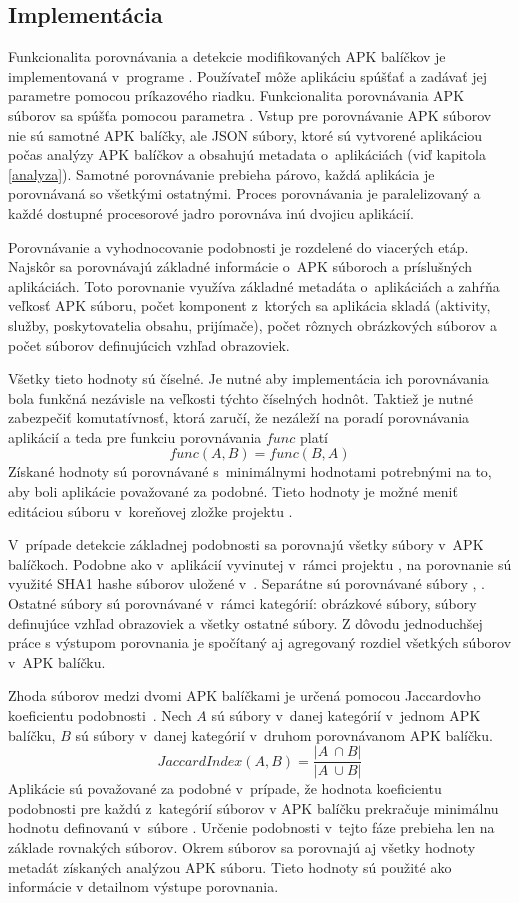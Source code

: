 \subsection{Implementácia}

Funkcionalita porovnávania a detekcie modifikovaných APK balíčkov je implementovaná v~programe . Používateľ môže aplikáciu spúšťať a zadávať jej parametre pomocou príkazového riadku. Funkcionalita porovnávania APK súborov sa spúšťa pomocou parametra . Vstup pre porovnávanie APK súborov nie sú samotné APK balíčky, ale JSON súbory, ktoré sú vytvorené aplikáciou  počas analýzy APK balíčkov a obsahujú metadata o~aplikáciách (viď kapitola \ref{analyza}). Samotné porovnávanie prebieha párovo, každá aplikácia je porovnávaná so všetkými ostatnými. Proces porovnávania je paralelizovaný a každé dostupné procesorové jadro porovnáva inú dvojicu aplikácií. 

Porovnávanie a vyhodnocovanie podobnosti je rozdelené do viacerých etáp. Najskôr sa porovnávajú základné informácie o~APK súboroch a príslušných aplikáciách. Toto porovnanie využíva základné metadáta o~aplikáciách a zahŕňa veľkosť APK súboru, počet komponent z~ktorých sa aplikácia skladá (aktivity, služby, poskytovatelia obsahu, prijímače), počet rôznych obrázkových súborov a počet súborov definujúcich vzhľad obrazoviek.

Všetky tieto hodnoty sú číselné. Je nutné aby implementácia ich porovnávania bola funkčná nezávisle na veľkosti týchto číselných hodnôt. Taktiež je nutné zabezpečiť komutatívnosť, ktorá zaručí, že nezáleží na poradí porovnávania aplikácií a teda pre funkciu porovnávania $func$ platí \[func(A,B) = func(B,A)\] Získané hodnoty sú porovnávané s~minimálnymi hodnotami potrebnými na to, aby boli aplikácie považované za podobné. Tieto hodnoty je možné meniť editáciou súboru  v~koreňovej zložke projektu .

V~prípade detekcie základnej podobnosti sa porovnajú všetky súbory v~APK balíčkoch. Podobne ako v~aplikácií vyvinutej v~rámci projektu , na porovnanie sú využité SHA1 hashe súborov uložené v~. Separátne sú porovnávané súbory , . Ostatné súbory sú porovnávané v~rámci kategórií: obrázkové súbory, súbory definujúce vzhľad obrazoviek a všetky ostatné súbory. Z dôvodu jednoduchšej práce s výstupom porovnania je spočítaný aj agregovaný rozdiel všetkých súborov v~APK balíčku. 

Zhoda súborov medzi dvomi APK balíčkami je určená pomocou Jaccardovho koeficientu podobnosti~\cite{Phillips2013}. Nech $A$ sú súbory v~danej kategórií v~jednom APK balíčku, $B$ sú súbory v~danej kategórií v~druhom porovnávanom APK balíčku. \[Jaccard Index(A,B) = \frac{|A~\cap B|}{ |A~\cup B|}\] Aplikácie sú považované za podobné v~prípade, že hodnota koeficientu podobnosti pre každú z~kategórií súborov v APK balíčku prekračuje minimálnu hodnotu definovanú v~súbore . Určenie podobnosti v~tejto fáze prebieha len na základe rovnakých súborov. Okrem súborov sa porovnajú aj všetky hodnoty metadát získaných analýzou APK súboru. Tieto hodnoty sú použité ako informácie v detailnom výstupe porovnania.

